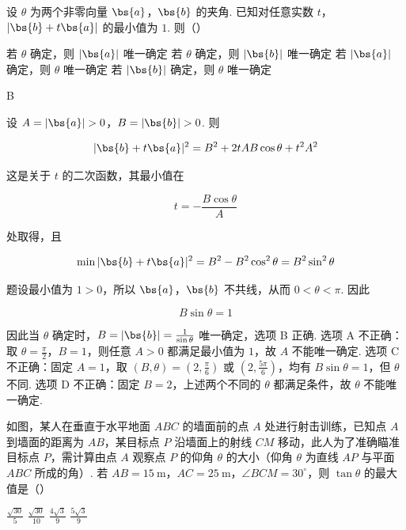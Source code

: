 \begin{problem}
设 \(\theta\) 为两个非零向量 \(\bs{a}\)，\(\bs{b}\) 的夹角. 已知对任意实数 \(t\)，\(|\bs{b} + t\bs{a}|\) 的最小值为 \(1\). 则（\quad）

\choices
    {若 \(\theta\) 确定，则 \(|\bs{a}|\) 唯一确定}
    {若 \(\theta\) 确定，则 \(|\bs{b}|\) 唯一确定}
    {若 \(|\bs{a}|\) 确定，则 \(\theta\) 唯一确定}
    {若 \(|\bs{b}|\) 确定，则 \(\theta\) 唯一确定}
\end{problem}

\begin{answer}
B
\end{answer}

\begin{solution}
设 \(A=|\bs{a}|>0\)，\(B=|\bs{b}|>0\). 则

\[
|\bs{b}+t\bs{a}|^{2}=B^{2}+2tAB\cos\theta+t^{2}A^{2}
\]

这是关于 \(t\) 的二次函数，其最小值在

\[
t=-\frac{B\cos\theta}{A}
\]

处取得，且

\[
\min|\bs{b}+t\bs{a}|^{2}=B^{2}-B^{2}\cos^{2}\theta=B^{2}\sin^{2}\theta
\]

题设最小值为 \(1>0\)，所以 \(\bs{a}\)，\(\bs{b}\) 不共线，从而 \(0<\theta<\pi\). 因此

\[
B\sin\theta=1
\]

因此当 \(\theta\) 确定时，\(B=|\bs{b}|=\frac{1}{\sin\theta}\) 唯一确定，选项 B 正确. 选项 A 不正确：取 \(\theta=\frac{\pi}{2}\)，\(B=1\)，则任意 \(A>0\) 都满足最小值为 \(1\)，故 \(A\) 不能唯一确定. 选项 C 不正确：固定 \(A=1\)，取 \((B,\theta)=(2,\frac{\pi}{6})\) 或 \((2,\frac{5\pi}{6})\)，均有 \(B\sin\theta=1\)，但 \(\theta\) 不同. 选项 D 不正确：固定 \(B=2\)，上述两个不同的 \(\theta\) 都满足条件，故 \(\theta\) 不能唯一确定.
\end{solution}

\begin{problem}
如图，某人在垂直于水平地面 \(ABC\) 的墙面前的点 \(A\) 处进行射击训练，已知点 \(A\) 到墙面的距离为 \(AB\)，某目标点 \(P\) 沿墙面上的射线 \(CM\) 移动，此人为了准确瞄准目标点 \(P\)，需计算由点 \(A\) 观察点 \(P\) 的仰角 \(\theta\) 的大小（仰角 \(\theta\) 为直线 \(AP\) 与平面 \(ABC\) 所成的角）. 若 \(AB = 15 \mathrm{~m}\)，\(AC = 25 \mathrm{~m}\)，\(\angle BCM = 30^{\circ}\)，则 \(\tan \theta\) 的最大值是（\quad）


\choices
    {\(\frac{\sqrt{30}}{5}\)}
    {\(\frac{\sqrt{30}}{10}\)}
    {\(\frac{4\sqrt{3}}{9}\)}
    {\(\frac{5\sqrt{3}}{9}\)}
\end{problem}

